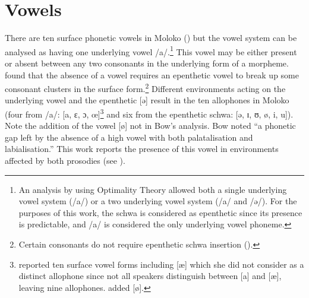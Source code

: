 \section{Vowels}\label{sec:2.3}
\hypertarget{RefHeading1210541525720847}{}
\largerpage
There are ten surface phonetic vowels in Moloko () but the vowel system can be analysed as having one underlying vowel /a/.\footnote{An analysis by \citet{Bow1999} using Optimality Theory allowed both a single underlying vowel system (/a/) or a two underlying vowel system (/a/ and /ə/).  For the purposes of this work, the schwa is considered as epenthetic since its presence is predictable, and /a/ is considered the only underlying vowel phoneme.}  This vowel may be either present or absent between any two consonants in the underlying form of a morpheme. \citet{Bow1997c} found that the absence of a vowel requires an epenthetic vowel to break up some consonant clusters in the surface form.\footnote{Certain consonants do not require epenthetic schwa insertion ().} Different environments acting on the underlying vowel and the epenthetic [ə] result in the ten allophones in Moloko (four from /a/: [a, ɛ, ɔ, œ]\footnote{\citet{Bow1997c} reported ten surface vowel forms including [æ] which she did not consider as a distinct allophone since not all speakers distinguish between [a] and [æ], leaving nine allophones. \citet{Friesen2001} added [ø].} and six from the epenthetic schwa: [ə, ɪ, ʊ, ø, i, u]).  Note the addition of the vowel [ø] not in Bow’s analysis. Bow noted “a phonetic gap left by the absence of a high vowel with both palatalisation and labialisation.” This work reports the presence of this vowel in environments affected by both prosodies (see ). 

